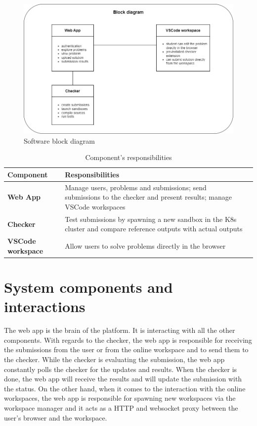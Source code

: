 \documentclass[12pt,a4paper]{report}
\begin{document}
\begin{figure}[h]
	\centering
	\includegraphics[width=\linewidth]{../photos/block-diagram.png}
	\caption{Software block diagram}
	\label{fig:software-architecture}
\end{figure}

\begin{table}[th]\small\linespread{1}
\caption{Component's responsibilities}
\label{tab:criterii}
\begin{tabular}{l >{\raggedright\arraybackslash}p{10cm} >{\raggedright\arraybackslash}p{0cm}}
\textbf{Component} & \textbf{Responsibilities} \\\hline
\textbf{Web App} & Manage users, problems and submissions; send submissions to the checker and present results; manage VSCode workspaces & \\
\hline
\textbf{Checker} & Test submissions by spawning a new sandbox in the K8s cluster and compare reference outputs with actual outputs & \\
\hline
\textbf{VSCode workspace} & Allow users to solve problems directly in the browser & \\
\hline
\end{tabular}
\end{table}

\newpage
\section{System components and interactions}
The web app is the brain of the platform. It is interacting with all the other components. With regards to the checker, the web app is responsible for receiving the submissions from the user or from the online workspace and to send them to the checker. While the checker is evaluating the submission, the web app constantly polls the checker for the updates and results. When the checker is done, the web app will receive the results and will update the submission with the status. On the other hand, when it comes to the interaction with the online workspaces, the web app is responsible for spawning new workspaces via the workspace manager and it acts as a HTTP and websocket proxy between the user's browser and the workspace.
\end{document}
